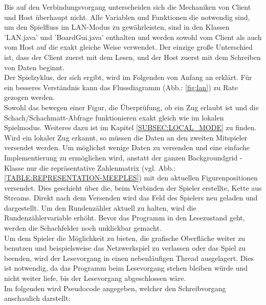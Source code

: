 \documentclass[12pt,a4paper]{article}
\begin{document}
Bis auf den Verbindungsvorgang unterscheiden sich die Mechaniken von Client und Host überhaupt nicht. Alle Variablen und Funktionen die notwendig sind, um den Spielfluss im LAN-Modus zu gewährleisten, sind in den Klassen 'LAN.java' und 'BoardGui.java' enthalten und werden sowohl vom Client als auch vom Host auf die exakt gleiche Weise verwendet. Der einzige große Unterschied ist, dass der Client zuerst mit dem Lesen, und der Host zuerst mit dem Schreiben von Daten beginnt. \\
Der Spielzyklus, der sich ergibt, wird im Folgenden von Anfang an erklärt. Für ein besseres Verständnis kann das Flussdiagramm (Abb.: \ref{fig:lan}) zu Rate gezogen werden.\\
Sowohl das bewegen einer Figur, die Überprüfung, ob ein Zug erlaubt ist und die Schach/Schachmatt-Abfrage funktionieren exakt gleich wie im lokalen Spielmodus. Weiteres dazu ist im Kapitel \ref{SUBSEC:LOCAL_MODE} zu finden.\\[2ex]
Wird ein lokaler Zug erkannt, so müssen die Daten an den zweiten Mitspieler versendet werden. Um möglichst wenige Daten zu versenden und eine einfache Implementierung zu ermöglichen wird, anstatt der ganzen Backgroundgrid - Klasse nur die repräsentative Zahlenmatrix (vgl. Abb.: \ref{TABLE:REPRESENTATION-MEEPLES}) mit den aktuellen Figurenpositionen versendet. Dies geschieht über die, beim Verbinden der Spieler erstellte, Kette aus Streams. Direkt nach dem Versenden wird das Feld des Spielers neu geladen und dargestellt. Um den Rundenzähler aktuell zu halten, wird die Rundenzählervariable erhöht. 
Bevor das Programm in den Lesezustand geht, werden die Schachfelder noch unklickbar gemacht.\\[2ex]
Um dem Spieler die Möglichkeit zu bieten, die grafische Oberfläche weiter zu benutzen und beispielsweise das Netzwerkspiel zu verlassen oder das Spiel zu beenden, wird der Lesevorgang in einen nebenläufigen Thread ausgelagert. Dies ist notwendig, da das Programm beim Lesevorgang stehen bleiben würde und nicht weiter liefe, bis der Lesevorgang abgeschlossen wäre.\\
Im folgenden wird Pseudocode angegeben, welcher den Schreibvorgang anschaulich darstellt:
\end{document}
